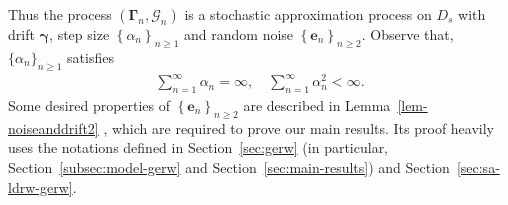 \documentclass[12pt]{amsart}
\theoremstyle{plain}
\theoremstyle{remark}
\numberwithin{equation}{section}
\begin{document}
Thus the process $\left(\boldsymbol{\Gamma}_{n}, \mathcal{G}_{n}\right)$ is a stochastic approximation process on ${D}_s$ with drift $\boldsymbol{\gamma}$, step size $\left\{\alpha_n\right\}_{n\geq 1}$ and random noise $\left\{\boldsymbol{e}_{n}\right\}_{n\geq 2}$. Observe that, $\{\alpha_n\}_{n\geq 1}$ satisfies 
\begin{align*}%
\sum_{n=1}^{\infty} \alpha_n = \infty, \quad \sum_{n=1}^{\infty} \alpha^2_n < \infty.
\end{align*}
Some desired properties of $\left\{\boldsymbol{e}_{n}\right\}_{n\geq 2}$ are described in Lemma~\ref{lem-noiseanddrift2}%
, which are required to prove our main results. %
Its proof heavily uses the notations defined in Section~\ref{sec:gerw} (in particular, Section~\ref{subsec:model-gerw} and Section~\ref{sec:main-results}) and Section~\ref{sec:sa-ldrw-gerw}. 
\end{document}
